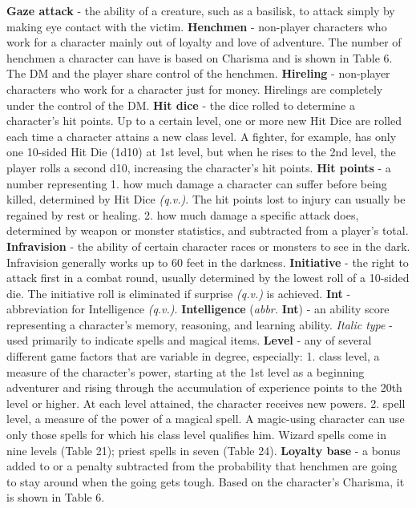 \documentclass[../main.tex]{subfiles}
\begin{document}
\begin{multicols}{3}
\textbf{Gaze attack} - the ability of a creature, such as a basilisk, to attack simply by making eye contact with the victim.
\textbf{Henchmen} - non-player characters who work for a character mainly out of loyalty and love of adventure. The number of henchmen a character can have is based on Charisma and is shown in Table 6. The DM and the player share control of the henchmen.
\textbf{Hireling} - non-player characters who work for a character just for money. Hirelings are completely under the control of the DM.
\textbf{Hit dice} - the dice rolled to determine a character's hit points. Up to a certain level, one or more new Hit Dice are rolled each time a character attains a new class level. A fighter, for example, has only one 10-sided Hit Die (1d10) at 1st level, but when he rises to the 2nd level, the player rolls a second d10, increasing the character's hit points.
\textbf{Hit points} - a number representing 1. how much damage a character can suffer before being killed, determined by Hit Dice \textit{(q.v.)}. The hit points lost to injury can usually be regained by rest or healing. 2. how much damage a specific attack does, determined by weapon or monster statistics, and subtracted from a player's total.
\textbf{Infravision} - the ability of certain character races or monsters to see in the dark. Infravision generally works up to 60 feet in the darkness.
\textbf{Initiative} - the right to attack first in a combat round, usually determined by the lowest roll of a 10-sided die. The initiative roll is eliminated if surprise \textit{(q.v.)} is achieved.
\textbf{Int} - abbreviation for Intelligence \textit{(q.v.)}.
\textbf{Intelligence} (\textit{abbr.} \textbf{Int}) - an ability score representing a character's memory, reasoning, and learning ability.
\textit{Italic type} - used primarily to indicate spells and magical items.
\textbf{Level} - any of several different game factors that are variable in degree, especially: 1. class level, a measure of the character's power, starting at the 1st level as a beginning adventurer and rising through the accumulation of experience points to the 20th level or higher. At each level attained, the character receives new powers. 2. spell level, a measure of the power of a magical spell. A magic-using character can use only those spells for which his class level qualifies him. Wizard spells come in nine levels (Table 21); priest spells in seven (Table 24).
\textbf{Loyalty base} - a bonus added to or a penalty subtracted from the probability that henchmen are going to stay around when the going gets tough. Based on the character's Charisma, it is shown in Table 6.

\end{multicols}
\end{document}
